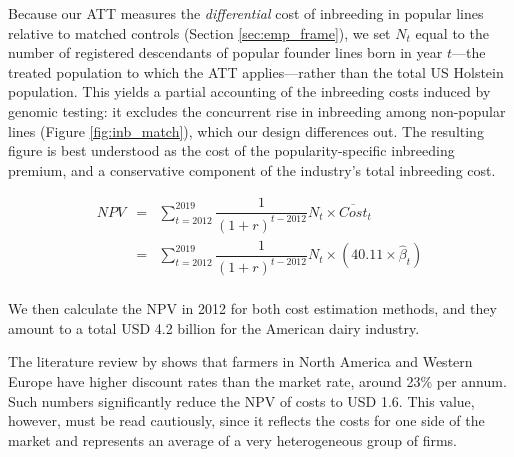 \documentclass[12pt,letterpaper]{article}
\begin{document}
Because our ATT measures the \emph{differential} cost of inbreeding in popular lines relative to matched controls (Section \ref{sec:emp_frame}), we set $N_{t}$ equal to the number of registered descendants of popular founder lines born in year $t$---the treated population to which the ATT applies---rather than the total US Holstein population. This yields a partial accounting of the inbreeding costs induced by genomic testing: it excludes the concurrent rise in inbreeding among non-popular lines (Figure \ref{fig:inb_match}), which our design differences out. The resulting figure is best understood as the cost of the popularity-specific inbreeding premium, and a conservative component of the industry's total inbreeding cost. %

\begin{eqnarray*}
NPV &=& \sum_{t = 2012}^{2019}\dfrac{1}{(1+r)^{t-2012}}N_{t}\times \overline{Cost}_{t}\\
&=& \sum_{t = 2012}^{2019}\dfrac{1}{(1+r)^{t-2012}}N_{t}\times\left(40.11\times \hat{\beta}_{t}\right)\\
\end{eqnarray*}

We then calculate the NPV in 2012 for both cost estimation methods, and they amount to a total USD 4.2 billion for the American dairy industry.

The literature review by \cite{Wuepper2023} shows that farmers in North America and Western Europe have higher discount rates than the market rate, around 23\% per annum. Such numbers significantly reduce the NPV of costs to USD 1.6. This value, however, must be read cautiously, since it reflects the costs for one side of the market and represents an average of a very heterogeneous group of firms.


\end{document}

